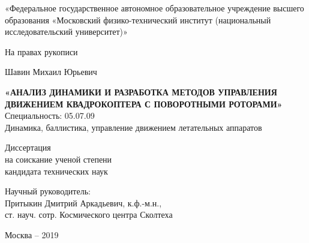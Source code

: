 \thispagestyle{empty}
\begin{comment} 
«Федеральное государственное бюджетное образовательное\\
учреждение высшего образования \\
«Московский авиационный институт \\
(национальный исследовательский университет)»
\end{comment}

\begin{center} 
«Федеральное государственное автономное образовательное учреждение высшего образования «Московский физико-технический институт (национальный исследовательский университет)»
\end{center}

{
\vskip 5mm
}

\begin{flushright}
На правах рукописи
\end{flushright}


{
   	\vskip 12mm
}

\begin{center}
	Шавин Михаил Юрьевич
\end{center}
\begin{center} 
	\textbf{«АНАЛИЗ ДИНАМИКИ И РАЗРАБОТКА МЕТОДОВ УПРАВЛЕНИЯ ДВИЖЕНИЕМ КВАДРОКОПТЕРА С ПОВОРОТНЫМИ РОТОРАМИ»} \\
	Специальность: 05.07.09 \\
	Динамика, баллистика, управление движением летательных аппаратов
\end{center}

{
	\vskip 6mm
}

\begin{center} 
	Диссертация \\
	на соискание ученой степени \\
	кандидата технических наук
\end{center}


{
	\vskip 12mm
}

\begin{flushright}
Научный руководитель: \hspace{46mm} \phantom{} \\
Притыкин Дмитрий Аркадьевич, к.ф.-м.н.,  \hspace{3mm} \phantom{}\\
ст. науч. сотр. Космического центра Сколтеха \\
\vspace{5mm}
\end{flushright}

{
	\vskip 8mm
}

\begin{center} 
Москва -- 2019
\end{center}
